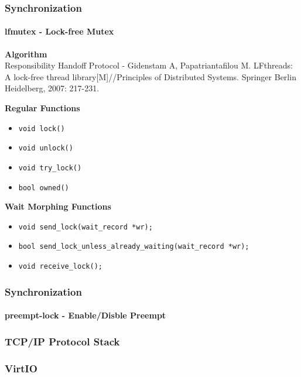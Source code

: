 \documentclass[10pt]{beamer}
\begin{document}
\begin{frame}
	\frametitle{Synchronization}
	\framesubtitle{lfmutex - Lock-free Mutex}
	
	\textbf{Algorithm} \\
	Responsibility Handoff Protocol - Gidenstam A, Papatriantafilou M. LFthreads: A lock-free thread library[M]//Principles of Distributed Systems. Springer Berlin Heidelberg, 2007: 217-231.

	\smallskip
	
	\textbf{Regular Functions}
	\begin{itemize}
		\item \texttt{void lock()}
		\item \texttt{void unlock()}
		\item \texttt{void try\_lock()}
		\item \texttt{bool owned()}
	\end{itemize}
	
	\smallskip
	
	\textbf{Wait Morphing Functions}
	\begin{itemize}
		\item \texttt{void send\_lock(wait\_record *wr);}
		\item \texttt{bool send\_lock\_unless\_already\_waiting(wait\_record *wr);}
		\item \texttt{void receive\_lock();}
	\end{itemize}
	
\end{frame}

\begin{frame}
	\frametitle{Synchronization}
	\framesubtitle{preempt-lock - Enable/Disble Preempt}

		
	
\end{frame}


\begin{frame}
	\frametitle{TCP/IP Protocol Stack}

\end{frame}

\begin{frame}
	\frametitle{VirtIO}

\end{frame}
\end{document}
